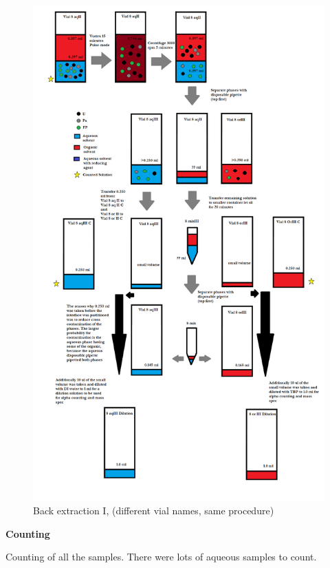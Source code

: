 \documentclass[idxtotoc,hyperref,openany,oneside]{labbook} %
\begin{document}
\begin{figure}[H] %
\begin{center}
  \includegraphics[width=0.8\linewidth]
                  {Figures/Cycle_x3_round_2_extraction_3}
\end{center}
\caption{Back extraction I, (different vial names, same procedure)}
\label{fig:round2_extraction3}
\end{figure}






\textbf{Counting}

Counting of all the samples. There were lots of aqueous samples to count.
\end{document}
